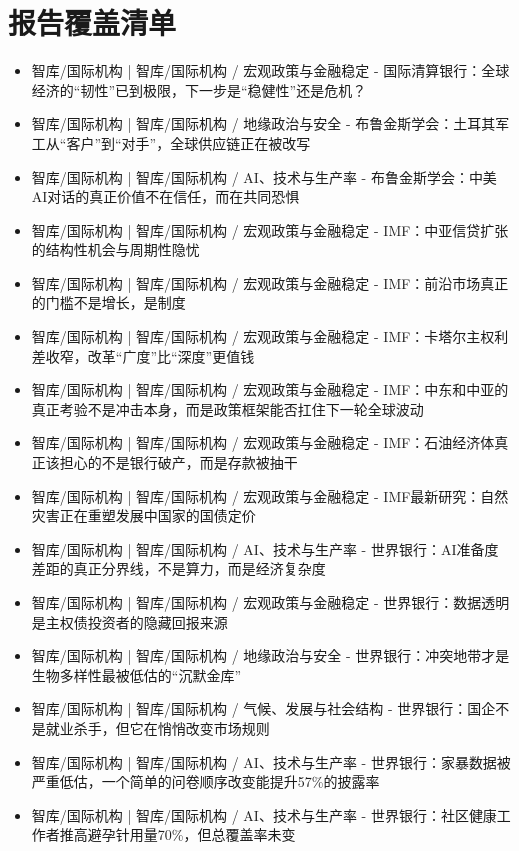 \documentclass[11pt]{ctexart}
\begin{document}
\section{报告覆盖清单}
\begin{itemize}
  \item [R001] 智库/国际机构 | 智库/国际机构 / 宏观政策与金融稳定 - 国际清算银行：全球经济的“韧性”已到极限，下一步是“稳健性”还是危机？
  \item [R002] 智库/国际机构 | 智库/国际机构 / 地缘政治与安全 - 布鲁金斯学会：土耳其军工从“客户”到“对手”，全球供应链正在被改写
  \item [R003] 智库/国际机构 | 智库/国际机构 / AI、技术与生产率 - 布鲁金斯学会：中美AI对话的真正价值不在信任，而在共同恐惧
  \item [R004] 智库/国际机构 | 智库/国际机构 / 宏观政策与金融稳定 - IMF：中亚信贷扩张的结构性机会与周期性隐忧
  \item [R005] 智库/国际机构 | 智库/国际机构 / 宏观政策与金融稳定 - IMF：前沿市场真正的门槛不是增长，是制度
  \item [R006] 智库/国际机构 | 智库/国际机构 / 宏观政策与金融稳定 - IMF：卡塔尔主权利差收窄，改革“广度”比“深度”更值钱
  \item [R007] 智库/国际机构 | 智库/国际机构 / 宏观政策与金融稳定 - IMF：中东和中亚的真正考验不是冲击本身，而是政策框架能否扛住下一轮全球波动
  \item [R008] 智库/国际机构 | 智库/国际机构 / 宏观政策与金融稳定 - IMF：石油经济体真正该担心的不是银行破产，而是存款被抽干
  \item [R009] 智库/国际机构 | 智库/国际机构 / 宏观政策与金融稳定 - IMF最新研究：自然灾害正在重塑发展中国家的国债定价
  \item [R010] 智库/国际机构 | 智库/国际机构 / AI、技术与生产率 - 世界银行：AI准备度差距的真正分界线，不是算力，而是经济复杂度
  \item [R011] 智库/国际机构 | 智库/国际机构 / 宏观政策与金融稳定 - 世界银行：数据透明是主权债投资者的隐藏回报来源
  \item [R012] 智库/国际机构 | 智库/国际机构 / 地缘政治与安全 - 世界银行：冲突地带才是生物多样性最被低估的“沉默金库”
  \item [R013] 智库/国际机构 | 智库/国际机构 / 气候、发展与社会结构 - 世界银行：国企不是就业杀手，但它在悄悄改变市场规则
  \item [R014] 智库/国际机构 | 智库/国际机构 / AI、技术与生产率 - 世界银行：家暴数据被严重低估，一个简单的问卷顺序改变能提升57\%的披露率
  \item [R015] 智库/国际机构 | 智库/国际机构 / AI、技术与生产率 - 世界银行：社区健康工作者推高避孕针用量70\%，但总覆盖率未变

\end{itemize}
\end{document}

